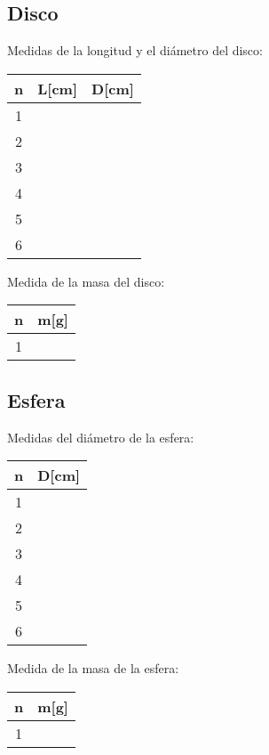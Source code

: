 \documentclass[letter,11pt]{article}
\begin{document}
\subsection{Disco}
Medidas de la longitud y el diámetro del disco:
\begin{center}
\begin{tabular}{|c|>{\centering}m{3.0cm}<{\centering}
                  |>{\centering}m{3.0cm}<{\centering}|}
\hline
\textbf{n} & \textbf{L[cm]} & \textbf{D[cm]} \tabularnewline \hline
1 & & \\ \hline
2 & & \\ \hline
3 & & \\ \hline
4 & & \\ \hline
5 & & \\ \hline
6 & & \\
\hline
\end{tabular}
\end{center}
\vspace{0.5cm}
Medida de la masa del disco:
\begin{center}
\begin{tabular}{|c|>{\centering}m{3.0cm}<{\centering}|}
\hline
\textbf{n} & \textbf{m[g]} \tabularnewline \hline
1 & \\
\hline
\end{tabular}
\end{center}

\subsection{Esfera}
Medidas del diámetro de la esfera:
\begin{center}
\begin{tabular}{|c|>{\centering}m{3.0cm}<{\centering}|}
\hline
\textbf{n} & \textbf{D[cm]} \tabularnewline \hline
1 & \\ \hline
2 & \\ \hline
3 & \\ \hline
4 & \\ \hline
5 & \\ \hline
6 & \\ \hline
\end{tabular}
\end{center}
\vspace{0.5cm}
Medida de la masa de la esfera:
\begin{center}
\begin{tabular}{|c|>{\centering}m{3.0cm}<{\centering}|}
\hline
\textbf{n} & \textbf{m[g]} \tabularnewline \hline
1 & \\
\hline
\end{tabular}
\end{center}
\end{document}
